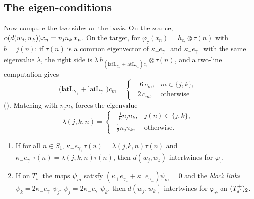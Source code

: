 \subsection{The eigen-conditions}
Now compare the two sides on the basis. On the source, $\operatorname{o}(d(w_j,w_k))x_n=n_jn_k\,x_n$. On the
target, for $\varphi_\tau(x_n)=h_{c_b}\otimes\tau(n)$ with $b=j(n)$: if $\tau(n)$ is a common eigenvector of
$\kappa_+e_{\gamma_+}$ and $\kappa_-e_{\gamma_-}$ with the same eigenvalue $\lambda$, the right side is
$\lambda\,h_{(\text{latL}_{\gamma_+}+\text{latL}_{\gamma_-})c_b}\otimes\tau(n)$, and a two-line computation gives
\begin{equation*}
  \bigl(\mathrm{latL}_{\gamma_+}+\mathrm{latL}_{\gamma_-}\bigr)c_m=\begin{cases}-6\,c_m,& m\in\{j,k\},\\ \ \ 2\,c_m,&\text{otherwise}\end{cases}
\end{equation*}
(). Matching with $n_jn_k$ forces the eigenvalue
\begin{equation*}
  \lambda(j,k,n)=\begin{cases}-\tfrac16 n_jn_k,& j(n)\in\{j,k\},\\ \ \ \tfrac12 n_jn_k,&\text{otherwise.}\end{cases}
\end{equation*}
\begin{theorem}\label{ch13:thm:offdiag}
\begin{enumerate}[label=(\alph*)]
\item If for all $n\in S_1$, $\kappa_+e_{\gamma_+}\tau(n)=\lambda(j,k,n)\tau(n)$ and
  $\kappa_-e_{\gamma_-}\tau(n)=\lambda(j,k,n)\tau(n)$, then $d(w_j,w_k)$ intertwines for $\varphi_\tau$.
\item If on $T_{s'}$ the maps $\psi_m$ satisfy $(\kappa_+e_{\gamma_+}+\kappa_-e_{\gamma_-})\psi_m=0$ and the
  \emph{block links} $\psi_k=2\kappa_-e_{\gamma_-}\psi_j$, $\psi_j=2\kappa_-e_{\gamma_-}\psi_k$, then $d(w_j,w_k)$
  intertwines for $\varphi_\psi$ on $(T_{s'}^{+})_2$.
\end{enumerate}
\end{theorem}
